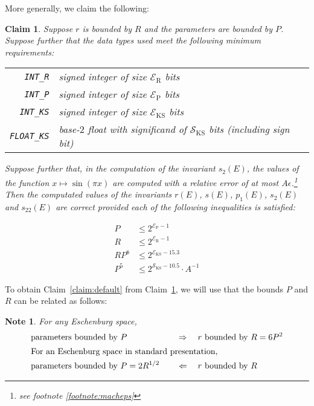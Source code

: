 \documentclass{article}
\newtheorem{note}{Note}
\newtheorem{claim}{Claim}
\newcommand{\macheps}{\epsilon} %
\newcommand{\expP}{\mathcal E_{\text{P}}}
\newcommand{\expR}{\mathcal E_{\text{R}}}
\newcommand{\expKS}{\mathcal E_{\text{KS}}}
\newcommand{\sigKS}{\mathcal S_{\text{KS}}}
\begin{document}
More generally, we claim the following:
\begin{claim}\label{claim:bits}
  Suppose \(r\) is bounded by \(R\) and the parameters are bounded by \(P\).
  Suppose further that the data types used meet the following minimum requirements:
  
  \begin{tabular}{rp{\linewidth-5em}}
    \verb+INT_R+ & signed integer of size \(\expR\) bits \\
    \verb+INT_P+ & signed integer of size \(\expP\) bits \\
    \verb+INT_KS+ & signed integer of size \(\expKS\) bits \\
    \verb+FLOAT_KS+ & base-\(2\) float with significand of \(\sigKS\) bits (including sign bit)
  \end{tabular}
  
  Suppose further that, in the computation of the invariant \(s_{2}(E)\), the values of the function \(x\mapsto\sin(\pi x)\) are computed with a relative error of at most \(A\macheps\).\footnote{
    see footnote \ref{footnote:macheps}
  }
  Then the computated values of the invariants \(r(E)\), \(s(E)\), \(p_1(E)\), \(s_2(E)\) and \(s_{22}(E)\)
  are correct provided each of the following inequalities is satisfied:
  \begin{multicols}{2}
    \noindent\allowdisplaybreaks
  \begin{align*}
    P & \leq 2^{\expP-1}  \label{eq:bits:PeP}\tag{$a$}          \\
    R    & \leq 2^{\expR-1}  \label{eq:bits:ReR}\tag{$b$}      \\
    RP^8 & \leq 2^{\expKS-15.3} \label{eq:bits:PeKS} \tag{$c$}   \\
    P^5  & \leq 2^{\sigKS-10.5}\label{eq:bits:PsKS}·A^{-1} \tag{$d$}
  \end{align*}
  \end{multicols}
\end{claim}

To obtain Claim~\ref{claim:default} from Claim~\ref{claim:bits}, we will use that the bounds \(P\) and \(R\) can be related as follows:
\begin{note}\label{lem:P-vs-R}
  For any Eschenburg space, 
  \begin{alignat*}{7}
    &\text{parameters bounded by } P &&\quad\Rightarrow\quad r \text{ bounded by } R = 6 P^2\\
    \intertext{%
    For an Eschenburg space in standard presentation,}
    &\text{parameters bounded by } P = 2R^{1/2} &&\quad\Leftarrow\quad r \text{ bounded by } R 
  \end{alignat*}
\end{note}
\end{document}
